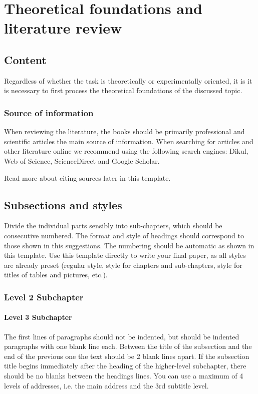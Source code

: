 \chapter{Theoretical foundations and literature review}\label{cha:theoretic_foundations}

\section{Content}\label{sec:content}
Regardless of whether the task is theoretically or experimentally oriented, it is
it is necessary to first process the theoretical foundations of the discussed topic.

\subsection{Source of information}\label{sec:source_of_information}
When reviewing the literature, the books should be primarily professional and scientific
articles the main source of information. When searching for articles and other literature online
we recommend using the following search engines: Dikul, Web of Science, ScienceDirect
and Google Scholar.

Read more about citing sources later in this template.

\section{Subsections and styles}\label{sec:subsections}
Divide the individual parts sensibly into sub-chapters, which should be consecutive
numbered. The format and style of headings should correspond to those shown in this
suggestions. The numbering should be automatic as shown in this template.
Use this template directly to write your final paper, as all styles are
already preset (regular style, style for chapters and sub-chapters, style for
titles of tables and pictures, etc.).

\subsection{Level 2 Subchapter}\label{sec:chapter_2}
\subsubsection{Level 3 Subchapter}\label{sec:chapter_3}

The first lines of paragraphs should not be indented, but should be indented
paragraphs with one blank line each. Between the title of the subsection and the end of the previous one
the text should be 2 blank lines apart. If the subsection title begins
immediately after the heading of the higher-level subchapter, there should be no blanks between the headings
lines. You can use a maximum of 4 levels of addresses, i.e. the main address and the 3rd
subtitle level.

